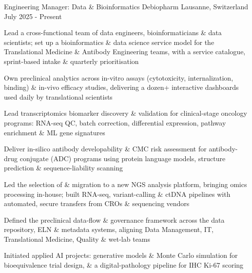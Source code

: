 
\begin{cventries}

\cventry
    {Engineering Manager: Data \& Bioinformatics}
    {Debiopharm}
    {Lausanne, Switzerland}
    {July 2025 - Present}
    {
      \begin{cvitems}
        \item Lead a cross-functional team of data engineers, bioinformaticians \& data scientists; set up a bioinformatics \& data science service model for the Translational Medicine \& Antibody Engineering teams, with a service catalogue, sprint-based intake \& quarterly prioritisation
        \item Own preclinical analytics across in-vitro assays (cytotoxicity, internalization, binding) \& in-vivo efficacy studies, delivering a dozen+ interactive dashboards used daily by translational scientists
        \item Lead transcriptomics biomarker discovery \& validation for clinical-stage oncology programs: RNA-seq QC, batch correction, differential expression, pathway enrichment \& ML gene signatures
        \item Deliver in-silico antibody developability \& CMC risk assessment for antibody-drug conjugate (ADC) programs using protein language models, structure prediction \& sequence-liability scanning
        \item Led the selection of \& migration to a new NGS analysis platform, bringing omics processing in-house; built RNA-seq, variant-calling \& ctDNA pipelines with automated, secure transfers from CROs \& sequencing vendors
        \item Defined the preclinical data-flow \& governance framework across the data repository, ELN \& metadata systems, aligning Data Management, IT, Translational Medicine, Quality \& wet-lab teams
        \item Initiated applied AI projects: generative models \& Monte Carlo simulation for bioequivalence trial design, \& a digital-pathology pipeline for IHC Ki-67 scoring
      \end{cvitems}
    }


\end{cventries}
